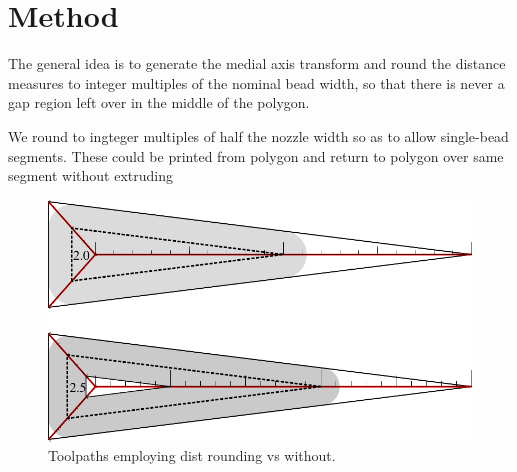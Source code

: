 \section{Method}
The general idea is to generate the medial axis transform and round the distance measures to integer multiples of the nominal bead width,
so that there is never a gap region left over in the middle of the polygon.

We round to ingteger multiples of half the nozzle width so as to allow single-bead segments.
These could be printed from polygon and return to polygon over same segment without extruding

\begin{figure}
\includegraphics[width=\columnwidth]{sources/method/rounded_vs_unrounded.pdf}
\caption{Toolpaths employing dist rounding vs without.}
\label{rounded_vs_unrounded}
\end{figure}


